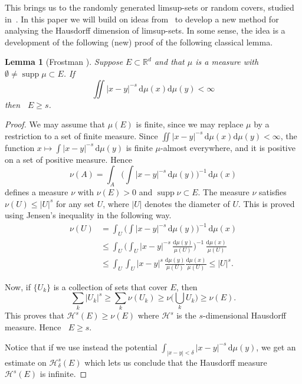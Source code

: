 \documentclass[11pt]{article}
\newtheorem{lemm}[theo]{Lemma}
\theoremstyle{definition}
\numberwithin{equation}{section}
\numberwithin{figure}{section}
\numberwithin{table}{section}
\DeclareMathOperator{\dimh}{dim_H}
\DeclareMathOperator{\supp}{supp}
\newcommand*{\dd}{\mathrm{d}}
\begin{document}
This brings us to the randomly generated limsup-sets or random covers, studied in~\cite{fanwu,durand,jarvenpaaetal,persson,fengetal,seuret,ekstrompersson}. In this paper we will build on ideas from~\cite{persson} to develop a new method for analysing the Hausdorff dimension of limsup-sets. In some sense, the idea is a development of the following (new) proof of the following classical lemma.

\begin{lemm}[Frostman {\cite[Th\'eor\`eme~47.2]{frostman}}]\label{lem:classical}
Suppose $E \subset \mathbb{R}^d$ and that $\mu$ is a measure with $\emptyset \neq \supp \mu \subset E$. If
\[
\iint |x-y|^{-s} \, \dd\mu (x) \dd \mu (y) < \infty
\]
then $\dimh E \geq s$.
\end{lemm}

\begin{proof}
We may assume that $\mu (E)$ is finite, since we may replace $\mu$ by a restriction to a set of finite measure. Since $\iint |x-y|^{-s}
\, \dd\mu (x) \dd \mu (y) < \infty$, the function $x
\mapsto \int |x-y|^{-s} \, \dd \mu (y)$ is finite $\mu$-almost everywhere, and it is positive on a set of positive measure. Hence
\[
\nu (A) = \int_A \biggl(\int |x-y|^{-s} \, \dd \mu (y)
\biggr)^{-1} \, \dd \mu (x)
\]
defines a measure $\nu$ with $\nu (E) > 0$ and $\supp \nu \subset E$. The measure $\nu$ satisfies $\nu(U) \leq |U|^s$ for any set $U$, where $|U|$ denotes the diameter of $U$. This is proved using Jensen's inequality in the following way.
\begin{align*}
\nu (U) &= \int_U \biggl(\int |x-y|^{-s} \, \dd \mu (y)
\biggr)^{-1} \, \dd \mu (x) \\ &\leq \int_U \biggl(\int_U |x-y|^{-s} \, \frac{\dd \mu (y)}{\mu (U)} \biggr)^{-1} \,
\frac{\dd \mu (x)}{\mu (U)} \\ &\leq \int_U \int_U |x-y|^{s} \, \frac{\dd \mu (y)}{\mu (U)} \frac{\dd
\mu (x)}{\mu (U)} \leq |U|^s.
\end{align*}

Now, if $\{U_k\}$ is a collection of sets that cover $E$, then
\[
\sum_k |U_k|^s \geq \sum_k \nu (U_k) \geq \nu \biggl(\bigcup_k U_k
\biggr) \geq \nu (E).
\]
This proves that $\mathscr{H}^s (E) \geq \nu (E)$ where $\mathscr{H}^s$ is the $s$-dimensional Hausdorff measure. Hence $\dimh E \geq s$.

Notice that if we use instead the potential $\int_{|x-y|<\delta} |x-y|^{-s} \, \dd \mu (y)$, we get an estimate on $\mathscr{H}_\delta^s (E)$ which lets us conclude that the Hausdorff measure $\mathscr{H}^s (E)$ is infinite.
\end{proof}
\end{document}
